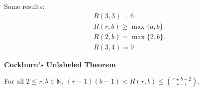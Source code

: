 \documentclass{article}
\begin{document}
    Some results:
    \begin{align*}
        R(3, 3) = 6 \\
        R(r, b) \geq \max\{a, b\}. \\
        R(2, b) = \max\{2, b\}. \\
        R(3, 4) = 9
    \end{align*}

\medskip\noindent\textbf{Cockburn's Unlabeled Theorem}

    For all $2 \leq r, b \in \mathbb N$, $(r-1)(b-1) < R(r, b) \leq {r + b - 2 \choose r - 1}$.
\end{document}
